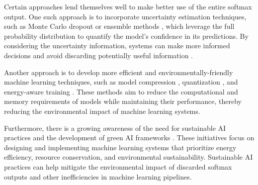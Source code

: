 Certain approaches lend themselves well to make better use of the entire softmax output. One such approach is to incorporate uncertainty estimation techniques, such as Monte Carlo dropout \cite{gal2016dropout} or ensemble methods \cite{lakshminarayanan2017simple}, which leverage the full probability distribution to quantify the model's confidence in its predictions. By considering the uncertainty information, systems can make more informed decisions and avoid discarding potentially useful information \cite{kendall2017uncertainties}.

Another approach is to develop more efficient and environmentally-friendly machine learning techniques, such as model compression \cite{han2015deep}, quantization \cite{gholami2021survey}, and energy-aware training \cite{garcia2021estimation}. These methods aim to reduce the computational and memory requirements of models while maintaining their performance, thereby reducing the environmental impact of machine learning systems.

Furthermore, there is a growing awareness of the need for sustainable AI practices and the development of green AI frameworks \cite{schwartz2020green}. These initiatives focus on designing and implementing machine learning systems that prioritize energy efficiency, resource conservation, and environmental sustainability. Sustainable AI practices can help mitigate the environmental impact of discarded softmax outputs and other inefficiencies in machine learning pipelines.




